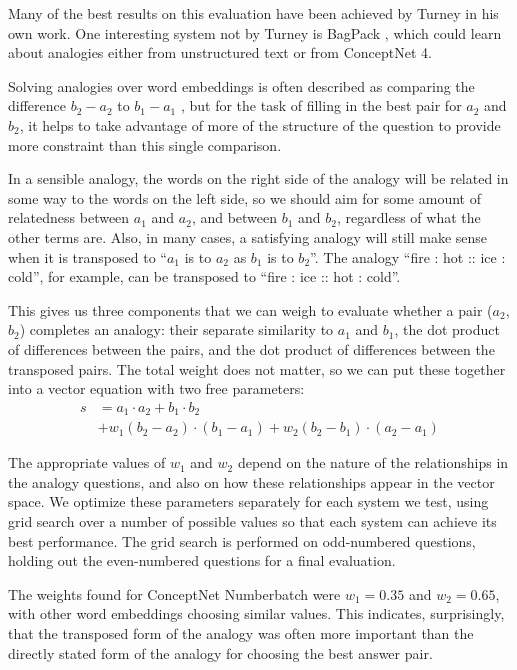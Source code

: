 \documentclass[letterpaper]{article}
\begin{document}
Many of the best results on this evaluation have been achieved by Turney in his
own work. One interesting system not by Turney is BagPack
\cite{herdagdelen2009bagpack}, which could learn about analogies either from
unstructured text or from ConceptNet 4.

Solving analogies over word embeddings is often described as comparing the
difference $b_2 - a_2$ to $b_1 - a_1$ \cite{mikolov2013word2vec}, but for the
task of filling in the best pair for $a_2$ and $b_2$, it helps to take
advantage of more of the structure of the question to provide more constraint
than this single comparison.

In a sensible analogy, the words on the right side of the analogy will be
related in some way to the words on the left side, so we should aim for some
amount of relatedness between $a_1$ and $a_2$, and between $b_1$ and $b_2$,
regardless of what the other terms are. Also, in many cases, a satisfying
analogy will still make sense when it is transposed to ``$a_1$ is to $a_2$ as
$b_1$ is to $b_2$''. The analogy ``fire : hot :: ice : cold'', for example, can
be transposed to ``fire : ice :: hot : cold''.

This gives us three components that we can weigh to evaluate whether a pair
($a_2$, $b_2$) completes an analogy: their separate similarity to $a_1$ and
$b_1$, the dot product of differences between the pairs, and the dot product of
differences between the transposed pairs.  The total weight does not matter, so
we can put these together into a vector equation with two free parameters:
\begin{equation*}
    \begin{split}
        s &= a_1 \cdot a_2 + b_1 \cdot b_2\\
          &  + w_1(b_2 - a_2) \cdot (b_1 - a_1)
             + w_2(b_2 - b_1) \cdot (a_2 - a_1)
    \end{split}
\end{equation*}

The appropriate values of $w_1$ and $w_2$ depend on the nature of the
relationships in the analogy questions, and also on how these relationships
appear in the vector space. We optimize these parameters separately for each
system we test, using grid search over a number of possible values so that each
system can achieve its best performance. The grid search is performed on
odd-numbered questions, holding out the even-numbered questions for a final
evaluation.

The weights found for ConceptNet Numberbatch were $w_1 = 0.35$ and $w_2 =
0.65$, with other word embeddings choosing similar values. This indicates,
surprisingly, that the transposed form of the analogy was often more important
than the directly stated form of the analogy for choosing the best answer pair.
\end{document}
